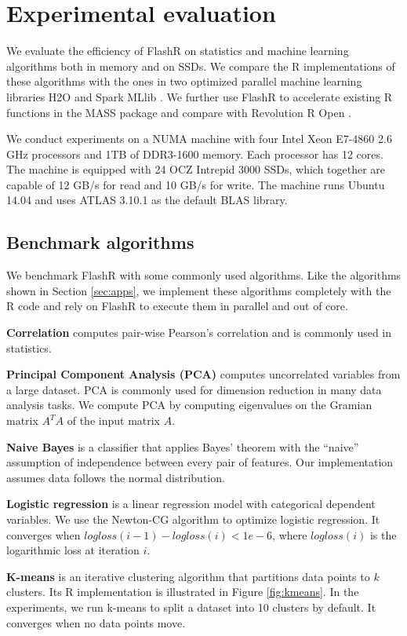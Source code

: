 \section{Experimental evaluation}
We evaluate the efficiency of FlashR on statistics and machine learning
algorithms both in memory and on SSDs. We compare the R implementations of
these algorithms with the ones in two optimized parallel machine learning
libraries H2O \cite{h2o} and Spark MLlib \cite{mllib}. We further use FlashR
to accelerate existing R functions in the MASS package and compare with
Revolution R Open \cite{rro}.

We conduct experiments on a NUMA machine with four Intel Xeon E7-4860 2.6 GHz
processors and 1TB of DDR3-1600 memory. Each processor has 12 cores. The machine
is equipped with 24 OCZ Intrepid 3000 SSDs, which together are capable of
12 GB/s for read and 10 GB/s for write. The machine runs Ubuntu 14.04 and
uses ATLAS 3.10.1 as the default BLAS library.

\subsection{Benchmark algorithms}\label{benchalg}
We benchmark FlashR with some commonly used algorithms. Like the algorithms
shown in Section \ref{sec:apps}, we implement these algorithms completely with
the R code and rely on FlashR to execute them in parallel and out of core.

\noindent \textbf{Correlation} computes pair-wise Pearson's correlation
\cite{cor} and is commonly used in statistics.

\noindent \textbf{Principal Component Analysis (PCA)} computes uncorrelated
variables from a large dataset. PCA is commonly used for dimension reduction
in many data analysis tasks. We compute PCA by computing eigenvalues on the Gramian
matrix $A^T A$ of the input matrix $A$.

\noindent \textbf{Naive Bayes} is a classifier that applies Bayes' theorem
with the ``naive'' assumption of independence between every pair of features.
Our implementation assumes data follows the normal distribution.

\noindent \textbf{Logistic regression} is a linear regression model with
categorical dependent variables. We use the Newton-CG algorithm
to optimize logistic regression. It converges when
$logloss(i-1)-logloss(i) < 1e-6$, where $logloss(i)$ is the logarithmic loss
at iteration $i$.

\noindent \textbf{K-means} is an iterative clustering algorithm that
partitions data points to $k$ clusters. Its R implementation is illustrated
in Figure \ref{fig:kmeans}. In the experiments, we run k-means to split
a dataset into 10 clusters by default. It converges when no data points
move.

